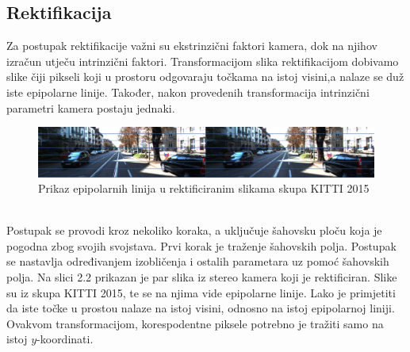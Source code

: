 \documentclass[times, utf8, zavrsni]{fer}
\begin{document}
\subsection{Rektifikacija}
Za postupak rektifikacije važni su ekstrinzični faktori kamera, dok na njihov izračun utječu intrinzični faktori. Transformacijom slika rektifikacijom dobivamo slike čiji pikseli koji u prostoru odgovaraju točkama na istoj visini,a nalaze se duž iste epipolarne linije. Također, nakon provedenih transformacija intrinzični parametri kamera postaju jednaki.\\
\begin{figure}[htb]
\centering
\includegraphics[width = 14.5cm]{img/slika3.png}
\caption{Prikaz epipolarnih linija u rektificiranim slikama skupa KITTI 2015}
\label{fig:Radial}
\end{figure}\\
Postupak se provodi kroz nekoliko koraka, a uključuje šahovsku ploču koja je pogodna zbog svojih svojstava. Prvi korak je traženje šahovskih polja. Postupak se nastavlja određivanjem izobličenja i ostalih parametara uz pomoć šahovskih polja.
Na slici 2.2 prikazan je par slika iz stereo kamera koji je rektificiran. Slike su iz skupa KITTI 2015, te se na njima vide epipolarne linije. Lako je primjetiti da iste točke u prostou nalaze na istoj visini, odnosno na istoj epipolarnoj liniji. Ovakvom transformacijom, korespodentne piksele potrebno je tražiti samo na istoj $y$-koordinati.
\end{document}
